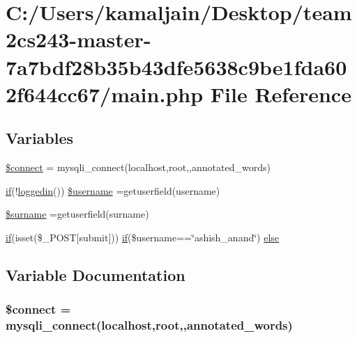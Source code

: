 \hypertarget{main_8php}{}\section{C\+:/\+Users/kamaljain/\+Desktop/team2cs243-\/master-\/7a7bdf28b35b43dfe5638c9be1fda602f644cc67/main.php File Reference}
\label{main_8php}
\subsection*{Variables}
\begin{DoxyCompactItemize}
\item 
\hyperlink{main_8php_a956617395b85e98d907df712f6d0d3f7}{\$connect} = mysqli\+\_\+connect(\textquotesingle{}localhost\textquotesingle{},\textquotesingle{}root\textquotesingle{},\textquotesingle{}\textquotesingle{},\textquotesingle{}annotated\+\_\+words\textquotesingle{})
\item 
\hyperlink{login_8php_a6cf3ef86567b2d2e235730bbe61cb311}{if}(!\hyperlink{core_8php_aab6c166eb2634a4ddbacc2f19417fe5c}{loggedin}()) \hyperlink{main_8php_acc098a0710d41b208e95c39f094a3e4c}{\$username} =getuserfield(\textquotesingle{}username\textquotesingle{})
\item 
\hyperlink{main_8php_a5c7ca58dd36213d80d84035699c3ed73}{\$surname} =getuserfield(\textquotesingle{}surname\textquotesingle{})
\item 
\hyperlink{login_8php_a6cf3ef86567b2d2e235730bbe61cb311}{if}(isset(\$\+\_\+\+P\+O\+ST\mbox{[}\textquotesingle{}submit\textquotesingle{}\mbox{]})) \hyperlink{login_8php_a6cf3ef86567b2d2e235730bbe61cb311}{if}(\$username==\char`\"{}ashish\+\_\+anand\char`\"{}) \hyperlink{main_8php_afda65626e1ddf4f77d7b41e578b697de}{else}
\end{DoxyCompactItemize}


\subsection{Variable Documentation}
\subsubsection[{\texorpdfstring{\$connect}{$connect}}]{\setlength{\rightskip}{0pt plus 5cm}\$connect = mysqli\+\_\+connect(\textquotesingle{}localhost\textquotesingle{},\textquotesingle{}root\textquotesingle{},\textquotesingle{}\textquotesingle{},\textquotesingle{}annotated\+\_\+words\textquotesingle{})}\hypertarget{main_8php_a956617395b85e98d907df712f6d0d3f7}{}\label{main_8php_a956617395b85e98d907df712f6d0d3f7}
